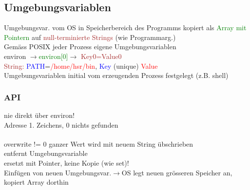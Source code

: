 \subsection{Umgebungsvariablen}
Umgebungsvar. vom OS in Speicherbereich des Programms kopiert als \textcolor{green}{Array mit Pointern} auf \textcolor{brown}{null-terminierte Strings} (wie Programmarg.)\\
Gemäss POSIX jeder Prozess eigene Umgebungsvariablen\\
environ $\rightarrow$\textcolor{green}{environ[0]}$\rightarrow$ \textcolor{brown}{Key0=Value0}\\
\textcolor{brown}{String:} \textcolor{blue}{PATH}=\textcolor{red}{/home/hsr/bin}, \textcolor{blue}{Key} (unique) \textcolor{red}{Value}\\
Umgebungsvariablen initial vom erzeugenden Prozess festgelegt (z.B. shell)

\subsubsection{API}
nie direkt über environ!\\
 Adresse 1. Zeichens, 0 nichts gefunden\\
\\
overwrite != 0 ganzer Wert wird mit neuem String übschrieben\\
 entfernt Umgebungsvariable\\
 ersetzt mit Pointer, keine Kopie (wie set)!\\

Einfügen von neuen Umgebungsvar.$\rightarrow$OS legt neuen grösseren Speicher an, kopiert Array dorthin